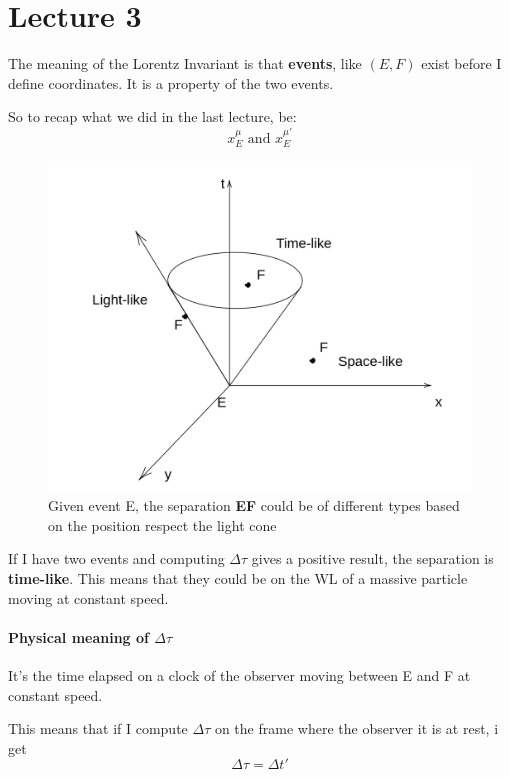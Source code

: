 \documentclass{report}
\begin{document}
\section{Lecture 3}

The meaning of the Lorentz Invariant is that \textbf{events}, like $\left( E,F \right)$ exist before I define coordinates. It is a property of the two events.

So to recap what we did in the last lecture, be:
\begin{equation}
x_{E}^{\mu } \text{ and } x_{E}^{\mu'}
\end{equation}

\begin{figure}[ht]
\centering
\includegraphics[width=\linewidth]{imm/lightcone.png}
\caption{Given event E, the separation \textbf{EF} could be of different types based on the position respect the light cone}
\label{imm:lightcone}
\end{figure}

If I have two events and computing $\Delta \tau $ gives a positive result, the separation is \textbf{time-like}.
This means that they could be on the WL of a massive particle moving at constant speed.

\paragraph{Physical meaning of $\Delta \tau $}
It's the time elapsed on a clock of the observer moving between E and F at constant speed.

This means that if I compute $\Delta \tau $ on the frame where the observer it is at rest, i get \[
\Delta \tau = \Delta t'
\]
\end{document}
